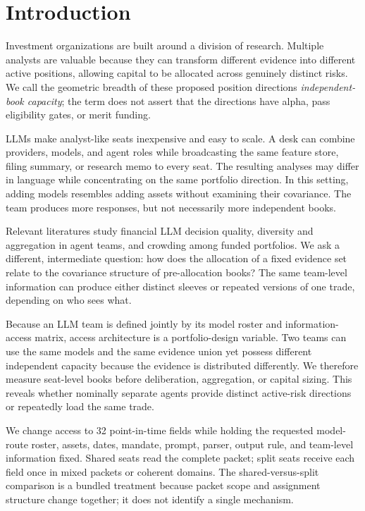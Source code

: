 \documentclass[sigconf]{acmart}
\begin{document}
\section{Introduction}
Investment organizations are built around a division of research. Multiple analysts are valuable because they can transform different evidence into different active positions, allowing capital to be allocated across genuinely distinct risks. We call the geometric breadth of these proposed position directions \emph{independent-book capacity}; the term does not assert that the directions have alpha, pass eligibility gates, or merit funding.

LLMs make analyst-like seats inexpensive and easy to scale. A desk can combine providers, models, and agent roles while broadcasting the same feature store, filing summary, or research memo to every seat. The resulting analyses may differ in language while concentrating on the same portfolio direction. In this setting, adding models resembles adding assets without examining their covariance. The team produces more responses, but not necessarily more independent books.

Relevant literatures study financial LLM decision quality, diversity and aggregation in agent teams, and crowding among funded portfolios. We ask a different, intermediate question: how does the allocation of a fixed evidence set relate to the covariance structure of pre-allocation books? The same team-level information can produce either distinct sleeves or repeated versions of one trade, depending on who sees what.

Because an LLM team is defined jointly by its model roster and information-access matrix, access architecture is a portfolio-design variable. Two teams can use the same models and the same evidence union yet possess different independent capacity because the evidence is distributed differently. We therefore measure seat-level books before deliberation, aggregation, or capital sizing. This reveals whether nominally separate agents provide distinct active-risk directions or repeatedly load the same trade.

We change access to 32 point-in-time fields while holding the requested model-route roster, assets, dates, mandate, prompt, parser, output rule, and team-level information fixed. Shared seats read the complete packet; split seats receive each field once in mixed packets or coherent domains. The shared-versus-split comparison is a bundled treatment because packet scope and assignment structure change together; it does not identify a single mechanism.
\end{document}
